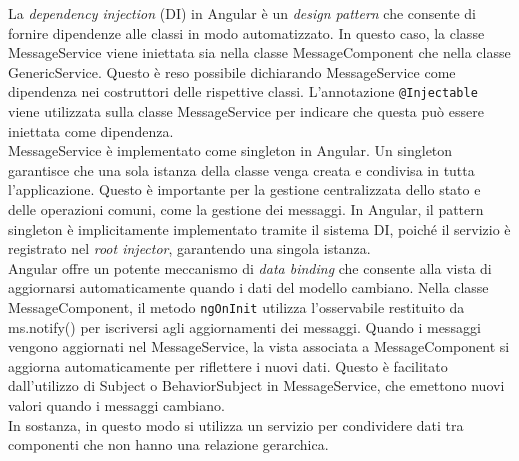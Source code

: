 La \textit{dependency injection} (DI) in Angular è un \textit{design pattern} che 
consente di fornire dipendenze alle classi in modo automatizzato. In questo 
caso, la classe MessageService viene iniettata sia nella classe 
MessageComponent che nella classe GenericService.
Questo è reso possibile dichiarando MessageService come dipendenza nei 
costruttori delle rispettive classi.
L'annotazione \texttt{@Injectable} viene utilizzata sulla classe MessageService 
per indicare che questa può essere iniettata come dipendenza.\\
MessageService è implementato come singleton in Angular. Un singleton garantisce 
che una sola istanza della classe venga creata e condivisa in tutta 
l'applicazione.
Questo è importante per la gestione centralizzata dello stato e delle operazioni 
comuni, come la gestione dei messaggi.
In Angular, il pattern singleton è implicitamente implementato tramite il 
sistema DI, poiché il servizio è registrato nel \textit{root injector}, 
garantendo una singola istanza.\\
Angular offre un potente meccanismo di \textit{data binding} che consente alla 
vista di aggiornarsi automaticamente quando i dati del modello cambiano.
Nella classe MessageComponent, il metodo \texttt{ngOnInit} utilizza 
l'osservabile restituito da ms.notify() per iscriversi agli aggiornamenti dei 
messaggi.
Quando i messaggi vengono aggiornati nel MessageService, la vista associata a 
MessageComponent si aggiorna automaticamente per riflettere i nuovi dati.
Questo è facilitato dall'utilizzo di Subject o BehaviorSubject in 
MessageService, che emettono nuovi valori quando i messaggi cambiano.\\
In sostanza, in questo modo si utilizza un servizio per condividere dati tra
componenti che non hanno una relazione gerarchica.
